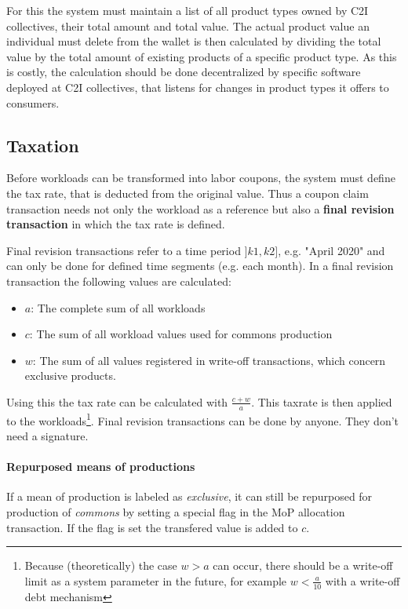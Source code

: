 \documentclass[11pt]{article}
\begin{document}
For this the system must maintain a list of all product types owned by C2I collectives, their total amount and total value. The actual product value an individual must delete from the wallet is then calculated by dividing the total value by the total amount of existing products of a specific product type. As this is costly, the calculation should be done decentralized by specific software deployed at C2I collectives, that listens for changes in product types it offers to consumers.

\subsection{Taxation}

Before workloads can be transformed into labor coupons, the system must define the tax rate, that is deducted from the original value. Thus a coupon claim transaction needs not only the workload as a reference but also a \textbf{final revision transaction} in which the tax rate is defined.

Final revision transactions refer to a time period $]k1, k2]$, e.g. "April 2020" and can only be done for defined time segments (e.g. each month). In a final revision transaction the following values are calculated:

\begin{itemize}
\item $a$: The complete sum of all workloads
\item $c$: The sum of all workload values used for commons production 
\item $w$: The sum of all values registered in write-off transactions, which concern exclusive products.
\end{itemize}

Using this the tax rate can be calculated with $\frac{c+w}{a}$. This taxrate is then applied to the workloads\footnote{Because (theoretically) the case $w > a$ can occur, there should be a write-off limit as a system parameter in the future, for example $w < \frac{a}{10}$ with a write-off debt mechanism}. Final revision transactions can be done by anyone. They don't need a signature.

\paragraph{Repurposed means of productions} If a mean of production is labeled as \emph{exclusive}, it can still be repurposed for production of \emph{commons} by setting a special flag in the MoP allocation transaction. If the flag is set the transfered value is added to $c$.
\end{document}
